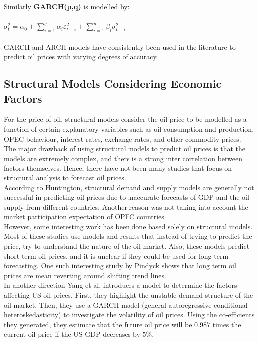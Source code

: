 \documentclass[runningheads]{llncs}
\begin{document}
\noindent Similarly \textbf{GARCH(p,q)} is modelled by:\\\\

$\sigma^2_{t} = \alpha_{0} + \sum\limits_{i=1}^q \alpha_{i}\varepsilon_{t-i}^2 + \sum\limits_{i=1}^p \beta_{i}\sigma_{t-i}^2 $\\\\

\noindent GARCH and ARCH models have consistently been used in the literature to predict oil prices with varying degrees of accuracy. 

\subsection{Structural Models Considering Economic Factors}

For the price of oil, structural models consider the oil price to be modelled as a function of certain explanatory variables such as oil consumption and production, OPEC behaviour, interest rates, exchange rates, and other commodity prices. The major drawback of using structural models to predict oil prices is that the models are extremely complex, and there is a strong inter correlation between factors themselves. Hence, there have not been many studies that focus on structural analysis to forecast oil prices.\\

\noindent According to Huntington\cite{huntington}, structural demand and supply models are generally not successful in predicting oil prices due to inaccurate forecasts of GDP and the oil supply from different countries. Another reason was not taking into account the market participation expectation of OPEC countries. \\

\noindent However, some interesting work has been done based solely on structural models. Most of these studies use models and results that instead of trying to predict the price, try to understand the nature of the oil market. Also, these models predict short-term oil prices, and it is unclear if they could be used for long term forecasting. One such interesting study by Pindyck\cite{pindyck} shows that long term oil prices are mean reverting around shifting trend lines. \\

\noindent In another direction Yang et al. \cite{yang} introduces a model to determine the factors affecting US oil prices. First, they highlight the unstable demand structure of the oil market. Then, they use a GARCH model (general autoregressive conditional heteroskedasticity) to investigate the volatility of oil prices. Using the co-efficients they generated, they estimate that the future oil price will be $0.987$ times the current oil price if the US GDP decreases by $5\%$. \\
\end{document}
